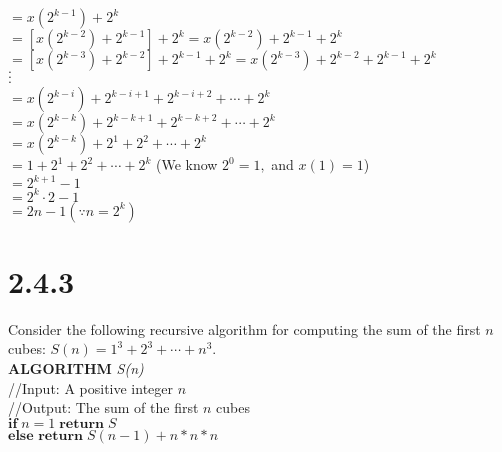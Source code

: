 \documentclass[8pt, letterpaper]{article}
\begin{document}
\indent \indent $= x(2^{k-1}) + 2^k$ \\
\indent \indent $= [x(2^{k-2}) + 2^{k-1}] + 2^k = x(2^{k-2}) + 2^{k-1} + 2^k$ \\
\indent \indent $= [x(2^{k-3}) + 2^{k-2}] + 2^{k-1} + 2^k = x(2^{k-3}) + 2^{k-2} + 2^{k-1} + 2^k$ \\
\indent \indent \indent \indent $\cdot$ \\
\indent \indent \indent \indent $\cdot$ \\
\indent \indent \indent \indent $\cdot$ \\
\indent \indent $= x(2^{k-i}) + 2^{k-i+1} + 2^{k-i+2} + \cdots + 2^k$ \\
\indent \indent $= x(2^{k-k}) + 2^{k-k+1} + 2^{k-k+2} + \cdots + 2^k$ \\ 
\indent \indent $= x(2^{k-k}) + 2^1 + 2^2 + \cdots + 2^k$ \\
\indent \indent $= 1 + 2^1 + 2^2 + \cdots + 2^k$ (We know $2^0 = 1,$ and $x(1) = 1$)  \\
\indent \indent $= 2^{k+1} - 1$ \\
\indent \indent $= 2^k \cdot 2 - 1$ \\
\indent \indent $= 2n-1 (\because n = 2^k)$

\section{2.4.3}
Consider the following recursive algorithm for computing the sum of the first $n$ cubes: $S(n) = 1^3 + 2^3 + \cdots + n^3$. \\
\textbf{ALGORITHM} \textit{S(n)} \\
\indent //Input: A positive integer $n$ \\
\indent //Output: The sum of the first $n$ cubes \\
\indent $\textbf{if}\; n = 1 \; \textbf{return} \; S$ \\
\indent $\textbf{else return} \; S(n-1) + n*n*n $ 
\end{document}

